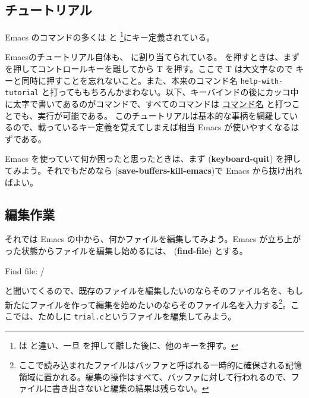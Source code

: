 \subsection{チュートリアル}
Emacs のコマンドの多くは
 と \footnote{ は  と違い、一旦  を押して離した後に、他のキーを押す。}にキー定義されている。

Emacsのチュートリアル自体も、
  に割り当てられている。  を押すときは、まずを押してコントロールキーを離してから T を押す。ここで T は大文字なので  キーと同時に押すことを忘れないこと。また、本来のコマンド名  {\tt help-with-tutorial} と打ってももちろんかまわない。以下、キーバインドの後にカッコ中に太字で書いてあるのがコマンドで、すべてのコマンドは  \underline{コマンド名} と打つことでも、実行が可能である。
このチュートリアルは基本的な事柄を網羅しているので、載っているキー定義を覚えてしまえば相当 Emacs が使いやすくなるはずである。

Emacs を使っていて何か困ったと思ったときは、まず  ({\bf keyboard-quit})
を押してみよう。それでもだめなら   ({\bf save-buffers-kill-emacs})で Emacs から抜け出ればよい。

\subsection{編集作業}
それでは Emacs の中から、何かファイルを編集してみよう。Emacs が立ち上がった状態からファイルを編集し始めるには、  ({\bf find-file})
とする。
\begin{commandline2}
Find file: \til /
\end{commandline2} \noindent
と聞いてくるので、既存のファイルを編集したいのならそのファイル名を、もし新たにファイルを作って編集を始めたいのならそのファイル名を入力する\footnote{ここで読み込まれたファイルはバッファと呼ばれる一時的に確保される記憶領域に置かれる。編集の操作はすべて、バッファに対して行われるので、ファイルに書き出さないと編集の結果は残らない。}。ここでは、ためしに {\tt trial.c}というファイルを編集してみよう。


